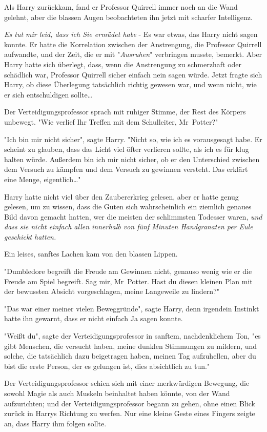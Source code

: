 {Als Harry zurückkam, fand er Professor Quirrell immer noch an die Wand gelehnt, aber die blassen Augen beobachteten ihn jetzt mit scharfer Intelligenz.

\emph{Es tut mir leid, dass ich Sie ermüdet habe} - Es war etwas, das Harry nicht sagen konnte. Er hatte die Korrelation zwischen der Anstrengung, die Professor Quirrell aufwandte, und der Zeit, die er mit "\emph{Ausruhen}" verbringen musste, bemerkt. Aber Harry hatte sich überlegt, dass, wenn die Anstrengung zu schmerzhaft oder schädlich war, Professor Quirrell sicher einfach nein sagen würde. Jetzt fragte sich Harry, ob diese Überlegung tatsächlich richtig gewesen war, und wenn nicht, wie er sich entschuldigen sollte…

Der Verteidigungsprofessor sprach mit ruhiger Stimme, der Rest des Körpers unbewegt. "Wie verlief Ihr Treffen mit dem Schulleiter, Mr~Potter?"

"Ich bin mir nicht sicher", sagte Harry. "Nicht so, wie ich es vorausgesagt habe. Er scheint zu glauben, dass das Licht viel öfter verlieren sollte, als ich es für klug halten würde. Außerdem bin ich mir nicht sicher, ob er den Unterschied zwischen dem Versuch zu kämpfen und dem Versuch zu gewinnen versteht. Das erklärt eine Menge, eigentlich…"

Harry hatte nicht viel über den Zaubererkrieg gelesen, aber er hatte genug gelesen, um zu wissen, dass die Guten sich wahrscheinlich ein ziemlich genaues Bild davon gemacht hatten, wer die meisten der schlimmsten Todesser waren, \emph{und dass sie nicht einfach allen innerhalb von fünf Minuten Handgranaten per Eule geschickt hatten.}

Ein leises, sanftes Lachen kam von den blassen Lippen.

"Dumbledore begreift die Freude am Gewinnen nicht, genauso wenig wie er die Freude am Spiel begreift. Sag mir, Mr~Potter. Hast du diesen kleinen Plan mit der bewussten Absicht vorgeschlagen, meine Langeweile zu lindern?"

"Das war einer meiner vielen Beweggründe", sagte Harry, denn irgendein Instinkt hatte ihn gewarnt, dass er nicht einfach Ja sagen konnte.

"Weißt du", sagte der Verteidigungsprofessor in sanftem, nachdenklichem Ton, "es gibt Menschen, die versucht haben, meine dunklen Stimmungen zu mildern, und solche, die tatsächlich dazu beigetragen haben, meinen Tag aufzuhellen, aber du bist die erste Person, der es gelungen ist, dies absichtlich zu tun."

Der Verteidigungsprofessor schien sich mit einer merkwürdigen Bewegung, die sowohl Magie als auch Muskeln beinhaltet haben könnte, von der Wand aufzurichten; und der Verteidigungsprofessor begann zu gehen, ohne einen Blick zurück in Harrys Richtung zu werfen. Nur eine kleine Geste eines Fingers zeigte an, dass Harry ihm folgen sollte.

}

